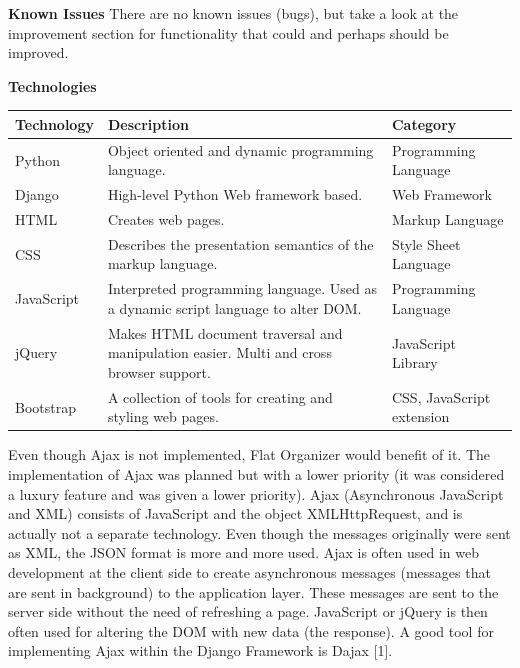 \documentclass{sig-alt-release2}
\begin{document}
\textbf{Known Issues}
There are no known issues (bugs), but take a look at the improvement section for functionality that could and perhaps should be improved.

\textbf{Technologies}

\begin{center}
    \begin{tabular}{ | p{1.7cm} | p{3.5cm} | p{2cm} |}
    \hline
	 \textbf{Technology} & \textbf{Description} & \textbf{Category} \\ \hline
	
	Python &	Object oriented and dynamic programming language.&	Programming Language \\ \hline
	Django	&High-level Python Web framework based.&	Web Framework \\ \hline
	HTML	&Creates web pages.	&Markup Language \\ \hline
	CSS	& Describes the presentation semantics of the markup language.&	Style Sheet Language \\ \hline
	JavaScript	&Interpreted programming language. Used as a dynamic script language to alter DOM.&	Programming Language \\ \hline
	jQuery	&Makes HTML document traversal and manipulation easier. Multi and cross browser support.&	JavaScript Library \\ \hline
	Bootstrap&	A collection of tools for creating and styling web pages.&	CSS, JavaScript extension    \\
	
    \hline
    \end{tabular}
\end{center}

Even though Ajax is not implemented, Flat Organizer would benefit of it. The implementation of Ajax was planned but with a lower priority (it was considered a luxury feature and was given a lower priority). Ajax (Asynchronous JavaScript and XML) consists of JavaScript and the object XMLHttpRequest, and is actually not a separate technology. Even though the messages originally were sent as XML, the JSON format is more and more used. Ajax is often used in web development at the client side to create asynchronous messages (messages that are sent in background) to the application layer. These messages are sent to the server side without the need of refreshing a page. JavaScript or jQuery is then often used for altering the DOM with new data (the response). A good tool for implementing Ajax within the Django Framework is Dajax [1].
\end{document}
